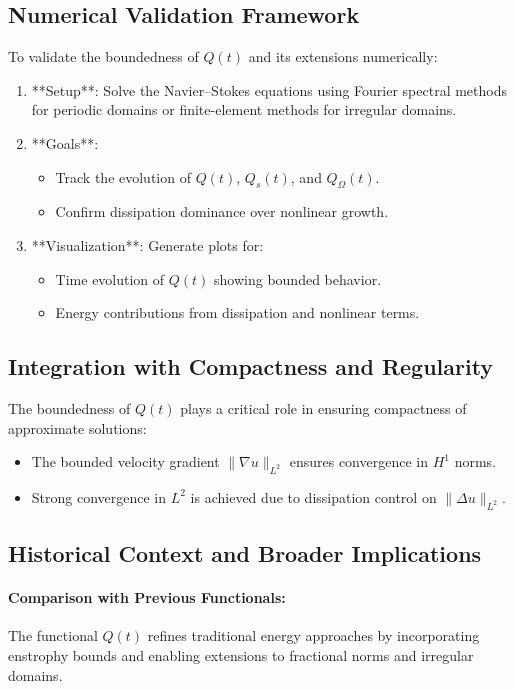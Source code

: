 \documentclass[12pt]{article}
\theoremstyle{definition}
\begin{document}
\subsection{Numerical Validation Framework}
To validate the boundedness of $Q(t)$ and its extensions numerically:
\begin{enumerate}
    \item **Setup**: Solve the Navier--Stokes equations using Fourier spectral methods for periodic domains or finite-element methods for irregular domains.
    \item **Goals**:
        \begin{itemize}
            \item Track the evolution of $Q(t)$, $Q_s(t)$, and $Q_\Omega(t)$.
            \item Confirm dissipation dominance over nonlinear growth.
        \end{itemize}
    \item **Visualization**: Generate plots for:
        \begin{itemize}
            \item Time evolution of $Q(t)$ showing bounded behavior.
            \item Energy contributions from dissipation and nonlinear terms.
        \end{itemize}
\end{enumerate}

\subsection{Integration with Compactness and Regularity}
The boundedness of $Q(t)$ plays a critical role in ensuring compactness of approximate solutions:
\begin{itemize}
    \item The bounded velocity gradient $\|\nabla u\|_{L^2}$ ensures convergence in $H^1$ norms.
    \item Strong convergence in $L^2$ is achieved due to dissipation control on $\|\Delta u\|_{L^2}$.
\end{itemize}

\subsection{Historical Context and Broader Implications}
\paragraph{Comparison with Previous Functionals:} The functional $Q(t)$ refines traditional energy approaches by incorporating enstrophy bounds and enabling extensions to fractional norms and irregular domains.
\end{document}
